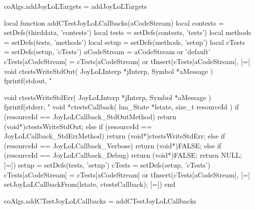 coAlgs.addJoyLoLTargets = addJoyLoLTargets
\stopLuaCode

\startMkIVCode
\def\addCTestJoyLoLCallbacks#1{%
  \directlua{
    thirddata.joylolCoAlgs.addCTestJoyLoLCallbacks('#1')
  }
}
\stopMkIVCode

\startLuaCode
local function addCTestJoyLoLCallbacks(aCodeStream)
  local contests      = setDefs(thirddata, 'contests')
  local tests         = setDefs(contests, 'tests')
  local methods       = setDefs(tests, 'methods')
  local setup         = setDefs(methods, 'setup')
  local cTests        = setDefs(setup, 'cTests')
  aCodeStream         = aCodeStream         or 'default'
  cTests[aCodeStream] = cTests[aCodeStream] or { }
  tInsert(cTests[aCodeStream], [=[
void ctestsWriteStdOut(
  JoyLoLInterp *jInterp,
  Symbol       *aMessage
) {
  fprintf(stdout, "%
}

void ctestsWriteStdErr(
  JoyLoLInterp *jInterp,
  Symbol       *aMessage
) {
  fprintf(stderr, "%
}
void *ctestsCallback(
  lua_State *lstate,
  size_t resourceId
) {
  if (resourceId == JoyLoLCallback_StdOutMethod) {
    return (void*)ctestsWriteStdOut;
  } else if (resourceId == JoyLoLCallback_StdErrMethod) {
    return (void*)ctestsWriteStdErr;
  } else if (resourceId == JoyLoLCallback_Verbose) {
    return (void*)FALSE;
  } else if (resourceId == JoyLoLCallback_Debug) {
    return (void*)FALSE;
  }
  return NULL;
} 
]=])
  setup               = setDefs(tests, 'setup')
  cTests              = setDefs(setup, 'cTests')
  cTests[aCodeStream] = cTests[aCodeStream] or { }
  tInsert(cTests[aCodeStream], [=[
setJoyLoLCallbackFrom(lstate, ctestsCallback);
]=])
end

coAlgs.addCTestJoyLoLCallbacks = addCTestJoyLoLCallbacks
\stopLuaCode

\startMkIVCode
\def\setJoylolVerboseOn{%
  \directlua{thirddata.joylol.setVerbose(true)}
}

\def\setJoylolVerboseOff{%
  \directlua{thirddata.joylol.setVerbose(false)}
}

\def\setJoylolDebuggingOn{%
  \directlua{thirddata.joylol.setDebugging(true)}
}

\def\setJoylolDebuggingOff{%
  \directlua{thirddata.joylol.setVDebugging(false)}
}

\def\setJoylolTracingOn{%
  \directlua{thirddata.joylol.setTracing(true)}
}

\def\setJoylolTracingOff{%
  \directlua{thirddata.joylol.setTracing(false)}
}

\def\setJoylolShowStackOn{%
  \directlua{thirddata.joylol.setShowStack(true)}
}

